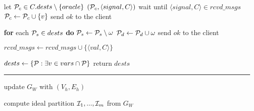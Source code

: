 \begin{algorithm}[t!]
\begin{distribalgo}[1]
		\STATE let $\mathcal{P}_c \in C.dests \setminus \{oracle\}$
		\STATE \rmcast$(\mathcal{P}_c, \langle signal, C \rangle )$
		\STATE wait until $\langle signal, C \rangle \in rcvd\_msgs$
		\STATE $\mathcal{P}_c \leftarrow \mathcal{P}_c \cup      \{v\}$
                \STATE send $ok$ to the client
	\ENDINDENT

	\vspace{1.0mm}
                \STATE \textbf{for} each $\mathcal{P}_s \in dests$ \textbf{do} $\mathcal{P}_s \leftarrow \mathcal{P}_s \setminus \omega$
                \STATE $\mathcal{P}_d \leftarrow \mathcal{P}_d \cup \omega$
                \STATE send $ok$ to the client
	\ENDINDENT

        \vspace{1.0mm}
    
		\STATE $rcvd\_msgs \leftarrow rcvd\_msgs \cup \{\langle val, C \rangle\}$
	\ENDINDENT
	
	\vspace{1.0mm}
		\STATE $dests \leftarrow \{ \mathcal{P} : \exists v \in vars \cap \mathcal{P} \}$
		\STATE return $dests$
	\ENDINDENT
	
	\rule{83mm}{0.4pt}

		\STATE update $G_W$ with $(V_h,E_h)$
	\ENDINDENT
	
	\vspace{1.0mm}
    
		\STATE compute ideal partition $\mathcal{I}_1, ..., \mathcal{I}_m$ from $G_W$
	\ENDINDENT
	
	\vspace{1.0mm}
    

\end{distribalgo}
\end{algorithm}
